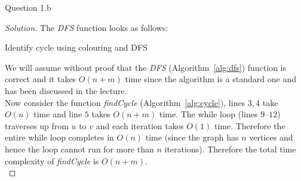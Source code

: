 \begin{solution}{Question 1.b}
\begin{proof}[Solution]
        The \textit{DFS} function looks as follows:
        \begin{algorithm}[H]
            \caption{Identify cycle using colouring and DFS}\label{alg:dfs}
            \begin{algorithmic}[1]
                          
                         
                                
                            \EndIf{}
                        \EndIf{}
                    \EndFor{}
                          
                \EndProcedure{}
            \end{algorithmic}
        \end{algorithm}
        We will assume without proof that the \textit{DFS} (Algorithm~\ref{alg:dfs}) function is correct and it takes $O(n+m)$ time since the algorithm is a standard one and has been discussed in the lecture.\\
        Now consider the function \textit{findCycle} (Algorithm~\ref{alg:cycle}), lines $3, 4$ take $O(n)$ time and line $5$ takes $O(n+m)$ time. The while loop (lines $9\text{--}12$) traverses up from $u$ to $v$ and each iteration takes $O(1)$ time. Therefore the entire while loop completes in $O(n)$ time (since the graph has $n$ vertices and hence the loop cannot run for more than $n$ iterations). Therefore the total time complexity of \textit{findCycle} is $O(n+m)$.\\


\end{proof}
\end{solution}
